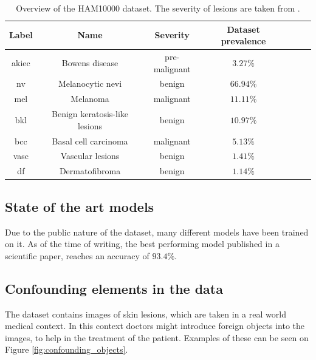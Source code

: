 \begin{table}[ht]
\begin{center}
\begin{tabular}{|c|c|c|c|c|c|c|}
\hline
Label    & Name                          & Severity      & Dataset prevalence \\ \hline
akiec    & Bowens disease                & pre-malignant & $3.27\%$           \\ \hline
nv       & Melanocytic nevi              & benign        & $66.94\%$          \\ \hline
mel      & Melanoma                      & malignant     & $11.11\%$          \\ \hline
bkl      & Benign keratosis-like lesions & benign        & $10.97\%$          \\ \hline
bcc      & Basal cell carcinoma          & malignant     & $5.13\%$           \\ \hline
vasc     & Vascular lesions              & benign        & $1.41\%$           \\ \hline
df       & Dermatofibroma                & benign        & $1.14\%$           \\ \hline
\end{tabular}
\end{center}

\caption{Overview of the HAM10000 dataset. The severity of lesions are taken from \cite{dermatologi-laerebogen}.}
\label{table:ham10000}
\end{table}

\subsection{State of the art models}\label{sec:state-of-the-art}
Due to the public nature of the dataset, many different models have been trained on it.
As of the time of writing, the best performing model published in a scientific paper,
reaches an accuracy of $93.4\%$\cite{datta2021soft}.

\subsection{Confounding elements in the data} \label{sec:confounding}
The dataset contains images of skin lesions, which are taken in a real world medical context.
In this context doctors might introduce foreign objects into the images,
to help in the treatment of the patient.
Examples of these can be seen on Figure \ref{fig:confounding_objects}.

